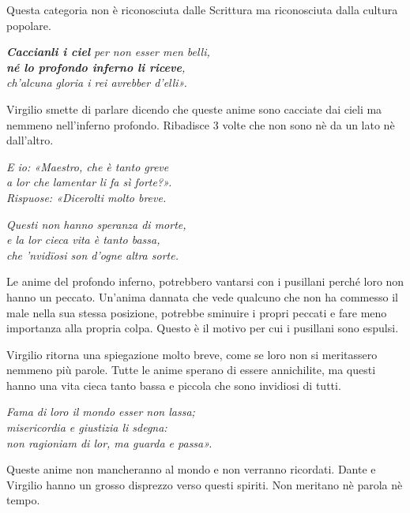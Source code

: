 \documentclass[a4paper]{article}
\begin{document}
Questa categoria non è riconosciuta dalle Scrittura ma riconosciuta dalla cultura popolare.

\begin{center}
    \textit{\textbf{Caccianli i ciel} per non esser men belli,} \\
    \textit{\textbf{né lo profondo inferno li riceve},} \\
    \textit{ch'alcuna gloria i rei avrebber d'elli».}
\end{center}

Virgilio smette di parlare dicendo che queste anime sono cacciate dai cieli
ma nemmeno nell'inferno profondo. Ribadisce 3 volte che non sono nè da un lato nè dall'altro.

\begin{center}
    \textit{E io: «Maestro, che è tanto greve} \\
    \textit{a lor che lamentar li fa sì forte?».} \\
    \textit{Rispuose: «Dicerolti molto breve.}
\end{center}

\begin{center}
    \textit{Questi non hanno speranza di morte,} \\
    \textit{e la lor cieca vita è tanto bassa,} \\
    \textit{che 'nvidïosi son d'ogne altra sorte.}
\end{center}

Le anime del profondo inferno, potrebbero vantarsi con i pusillani perché loro non hanno un peccato.
Un'anima dannata che vede qualcuno che non ha commesso il male nella sua stessa posizione,
potrebbe sminuire i propri peccati e fare meno importanza alla propria colpa.
Questo è il motivo per cui i pusillani sono espulsi.

Virgilio ritorna una spiegazione molto breve, come se loro non si meritassero nemmeno
più parole. Tutte le anime sperano di essere annichilite, ma questi
hanno una vita cieca tanto bassa e piccola che sono invidiosi di tutti.

\pagebreak

\begin{center}
    \textit{Fama di loro il mondo esser non lassa;} \\
    \textit{misericordia e giustizia li sdegna:} \\
    \textit{non ragioniam di lor, ma guarda e passa».}
\end{center}

Queste anime non mancheranno al mondo e non verranno ricordati.
Dante e Virgilio hanno un grosso disprezzo verso questi spiriti.
Non meritano nè parola nè tempo.
\end{document}
